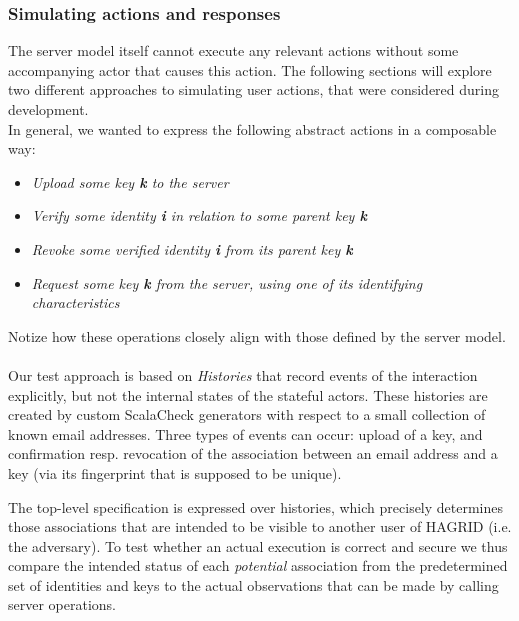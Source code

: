 \subsubsection{Simulating actions and responses}
The server model itself cannot execute any relevant actions without some accompanying actor that causes this action. The following sections will explore two different approaches to simulating user actions, that were considered during development. \\
In general, we wanted to express the following abstract actions in a composable way: 
\begin{itemize}
    \item \emph{Upload some key \textbf{k} to the server}
    \item \emph{Verify some identity \textbf{i} in relation to some parent key \textbf{k}}
    \item \emph{Revoke some verified identity \textbf{i} from its parent key \textbf{k}}
    \item \emph{Request some key \textbf{k} from the server, using one of its identifying characteristics}
\end{itemize}
Notize how these operations closely align with those defined by the server model.
\\ \\
Our test approach is based on \emph{Histories} that record events of the interaction explicitly, but not the internal states of the stateful actors.
These histories are created by custom ScalaCheck generators with respect to a small collection of known email addresses.
Three types of events can occur: upload of a key, and confirmation resp. revocation of the association between an email address and a key (via its fingerprint that is supposed to be unique).

The top-level specification is expressed over histories, which precisely determines those associations that are intended to be visible to another user of HAGRID (i.e. the adversary).
To test whether an actual execution is correct and secure we thus compare the intended status of each \emph{potential} association from the predetermined set of identities and keys to the actual observations that can be made by calling server operations.

